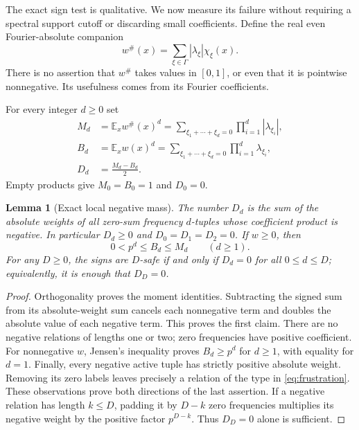 \documentclass[11pt]{article}
\numberwithin{equation}{section}
\newtheorem{lemma}[theorem]{Lemma}
\theoremstyle{definition}
\theoremstyle{remark}
\newcommand{\E}{\mathbb E}
\begin{document}
The exact sign test is qualitative. We now measure its failure without
requiring a spectral support cutoff or discarding small coefficients.
Define the real even Fourier-absolute companion
\begin{equation}
 w^\#(x)=\sum_{\xi\in\Gamma}|\lambda_\xi|\chi_\xi(x).
 \label{eq:abs-companion}
\end{equation}
There is no assertion that $w^\#$ takes values in $[0,1]$, or even that
it is pointwise nonnegative. Its usefulness comes from its Fourier
coefficients.

For every integer $d\geq0$ set
\begin{align}
 M_d&=\E_x w^\#(x)^d
   =\sum_{\xi_1+\cdots+\xi_d=0}
                  \prod_{i=1}^d|\lambda_{\xi_i}|,\label{eq:M}\\
 B_d&=\E_x w(x)^d
   =\sum_{\xi_1+\cdots+\xi_d=0}
                  \prod_{i=1}^d\lambda_{\xi_i},\label{eq:B}\\
 D_d&=\frac{M_d-B_d}{2}.\label{eq:D}
\end{align}
Empty products give $M_0=B_0=1$ and $D_0=0$.

\begin{lemma}[Exact local negative mass]
\label{lem:defect}
The number $D_d$ is the sum of the absolute weights of all zero-sum
frequency $d$-tuples whose coefficient product is negative. In particular
$D_d\geq0$ and $D_0=D_1=D_2=0$. If $w\geq0$, then
\begin{equation}
 0<p^d\leq B_d\leq M_d\qquad(d\geq1).
 \label{eq:moments-positive}
\end{equation}
For any $D\geq0$, the signs are $D$-safe if and only if
$D_d=0$ for all $0\leq d\leq D$; equivalently, it is enough that
$D_D=0$.
\end{lemma}
\begin{proof}
Orthogonality proves the moment identities. Subtracting the signed sum
from its absolute-weight sum cancels each nonnegative term and doubles
the absolute value of each negative term. This proves the first claim.
There are no negative relations of lengths one or two; zero frequencies
have positive coefficient. For nonnegative $w$, Jensen's inequality
proves $B_d\geq p^d$ for $d\geq1$, with equality for $d=1$.
Finally, every negative active tuple has strictly positive absolute
weight. Removing its zero labels leaves precisely a relation of the
type in \eqref{eq:frustration}. These observations prove both directions
of the last assertion. If a negative relation has length $k\leq D$,
padding it by $D-k$ zero frequencies multiplies its negative weight by
the positive factor $p^{D-k}$. Thus $D_D=0$ alone is sufficient.
\end{proof}
\end{document}
